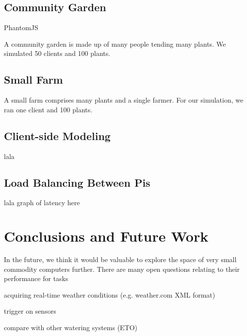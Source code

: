 \documentclass[a4paper]{acm_proc_article-sp}
\begin{document}
\subsection{Community Garden}

PhantomJS

A community garden is made up of many people tending many plants.  We simulated 50 clients and 100 plants.

\subsection{Small Farm}

A small farm comprises many plants and a single farmer.  For our simulation, we ran one client and 100 plants.

\subsection{Client-side Modeling}

lala

\subsection{Load Balancing Between Pis}

lala
graph of latency here

\section{Conclusions and Future Work}

In the future, we think it would be valuable to explore the space of very small commodity computers further.  There are many open questions relating to their performance for tasks

acquiring real-time weather conditions (e.g. weather.com XML format)

trigger on sensors

compare with other watering systems (ETO)



\end{document}
